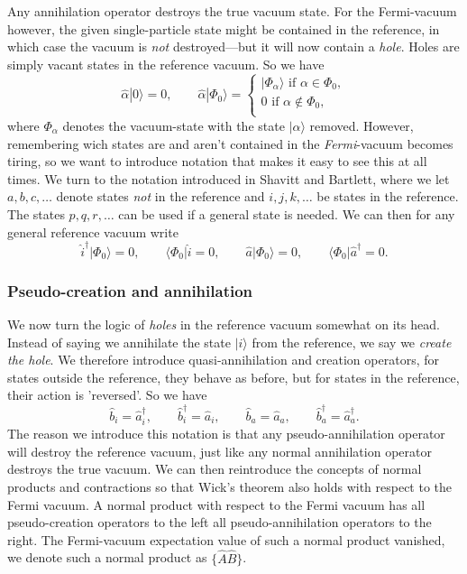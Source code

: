 \documentclass[a4paper, 11pt, notitlepage, english]{article}
\newcommand{\bra}[1]{\langle #1|}
\newcommand{\ket}[1]{|#1 \rangle}
\newcommand{\op}[1]{\hat{#1}}
\begin{document}
\newpage

Any annihilation operator destroys the true vacuum state. For the Fermi-vacuum however, the given single-particle state might be contained in the reference, in which case the vacuum is \emph{not} destroyed---but it will now contain a \emph{hole}. Holes are simply vacant states in the reference vacuum. So we have
$$\op{\alpha} \ket{0} = 0, \qquad \op{\alpha} \ket{\Phi_0} = \begin{cases}
	\ket{\Phi_\alpha} \mbox{ if } \alpha \in \Phi_0, \\
	0 \mbox{ if } \alpha \not\in \Phi_0, \\
\end{cases}$$
where $\Phi_\alpha$ denotes the vacuum-state with the state $\ket{\alpha}$ removed. However, remembering wich states are and aren't contained in the \emph{Fermi}-vacuum becomes tiring, so we want to introduce notation that makes it easy to see this at all times. We turn to the notation introduced in Shavitt and Bartlett, where we let $a, b, c,\ldots$ denote states \emph{not} in the reference and $i,j,k, \ldots$ be states in the reference. The states $p,q,r,\ldots$ can be used if a general state is needed. We can then for any general reference vacuum write
$$\op{i}^\dag \ket{\Phi_0} = 0, \qquad \bra{\Phi_0} \op{i} = 0, \qquad \op{a}\ket{\Phi_0} = 0, \qquad \bra{\Phi_0}\op{a}^\dag = 0.$$

\subsubsection*{Pseudo-creation and annihilation}

We now turn the logic of \emph{holes} in the reference vacuum somewhat on its head. Instead of saying we annihilate the state $\ket{i}$ from the reference, we say we \emph{create the hole}. We therefore introduce quasi-annihilation and creation operators, for states outside the reference, they behave as before, but for states in the reference, their action is 'reversed'. So we have
$$\op{b}_i = \op{a}_i^\dag, \qquad \op{b}_i^\dag = \op{a}_i, \qquad \op{b}_a = \op{a}_a, \qquad \op{b}_a^\dag = \op{a}_a^\dag.$$
The reason we introduce this notation is that any pseudo-annihilation operator will destroy the reference vacuum, just like any normal annihilation operator destroys the true vacuum. We can then reintroduce the concepts of normal products and contractions so that Wick's theorem also holds with respect to the Fermi vacuum. A normal product with respect to the Fermi vacuum has all pseudo-creation operators to the left all pseudo-annihilation operators to the right. The Fermi-vacuum expectation value of such a normal product vanished, we denote such a normal product as $\{\op{A}\op{B}\}$. 
\end{document}
